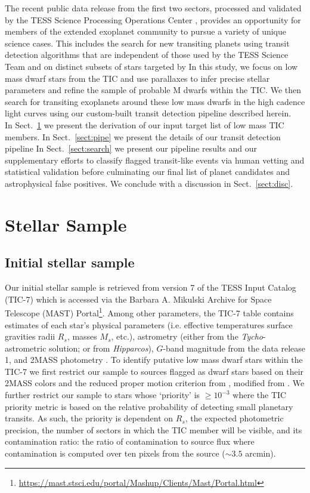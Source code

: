 The recent public data release from the first two \tess{} sectors, processed and validated by the
TESS Science Processing Operations Center \citep[SPOC;][]{jenkins16,twicken18,li18}, provides an opportunity
for members of the extended exoplanet community to pursue a variety of unique science cases. This
includes the search for new transiting planets using transit detection algorithms that are independent
of those used by the TESS Science Team and on distinct subsets of stars targeted by 
In this study, we focus on low mass dwarf stars from the TIC and use \gaia{} parallaxes to infer precise
stellar parameters and refine the sample of probable M dwarfs within the TIC. We then search for transiting
exoplanets around these low mass dwarfs in the high cadence \tess{} light curves using our
custom-built transit detection pipeline described herein. \\

In Sect.~\ref{sect:stars} we present the derivation of our input target list of low mass TIC members.
In Sect.~\ref{sect:pipe} we present the details of our transit detection pipeline  In
Sect.~\ref{sect:search} we present our pipeline results and our supplementary efforts to
classify flagged transit-like events via human vetting and statistical validation before
culminating our final list of planet candidates and astrophysical false positives.
We conclude with a discussion in Sect.~\ref{sect:disc}.


\section{Stellar Sample} \label{sect:stars}
\subsection{Initial stellar sample}
Our initial stellar sample is retrieved from version 7 of the TESS Input Catalog (TIC-7) which
is accessed via the Barbara A. Mikulski Archive for Space Telescope (MAST)
Portal\footnote{\url{https://mast.stsci.edu/portal/Mashup/Clients/Mast/Portal.html}}. Among other
parameters, the TIC-7 table contains estimates of each star's physical parameters (i.e. effective
temperatures \teff{,} surface gravities \logg{,} radii $R_s$, masses $M_s$, etc.),
astrometry (either from the \emph{Tycho}-\gaia{} astrometric solution; \citealt{gaia16,brown16}
or from \emph{Hipparcos}), $G$-band magnitude from the \gaia{} data release 1, and 2MASS photometry
\citep{cutri03}. To identify putative low mass dwarf stars within the TIC-7 we first restrict our sample to
sources flagged as dwarf stars based on their 2MASS colors and the reduced proper motion criterion
from \cite{stassun17}, modified from \cite{collier07}. We further restrict our sample to stars whose
`priority' is $\geq 10^{-3}$ where the TIC priority metric is based on the relative probability 
of detecting small planetary transits. As such, the priority is dependent on $R_s$, the
expected photometric precision, the number of \tess{} sectors in which the TIC member will be visible, and its
contamination ratio: the ratio of contamination to source flux where contamination is computed over ten
\tess{} pixels from the source ($\sim 3.5$ arcmin). \\

